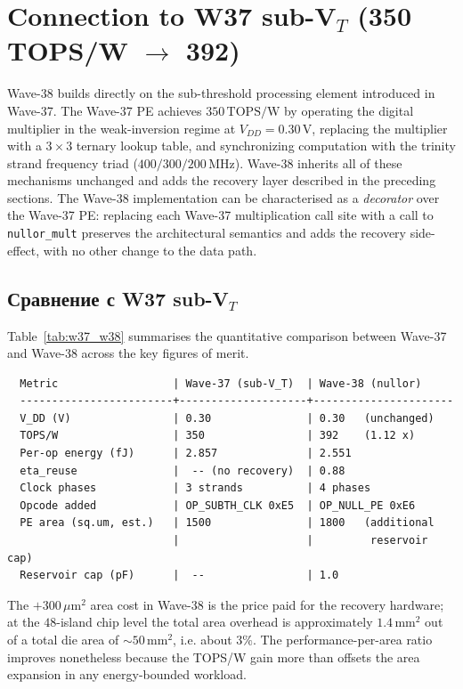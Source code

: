 \section{Connection to W37 sub-V$_T$ (350 TOPS/W $\to$ 392)}
\label{sec:w37_w38_link}

Wave-38 builds directly on the sub-threshold processing element introduced in
Wave-37.  The Wave-37 PE achieves $350\,\text{TOPS/W}$ by operating the digital
multiplier in the weak-inversion regime at $V_{DD} = 0.30\,\text{V}$, replacing the
multiplier with a $3\times 3$ ternary lookup table, and synchronizing computation
with the trinity strand frequency triad ($400/300/200\,\text{MHz}$).  Wave-38
inherits all of these mechanisms unchanged and adds the recovery layer described in
the preceding sections.  The Wave-38 implementation can be characterised as a
\emph{decorator} over the Wave-37 PE: replacing each Wave-37 multiplication call
site with a call to \texttt{nullor\_mult} preserves the architectural
semantics and adds the recovery side-effect, with no other change to the data path.

\subsection{Сравнение с W37 sub-V$_T$}
\label{subsec:w37_compare}

Table~\ref{tab:w37_w38} summarises the quantitative comparison between Wave-37 and
Wave-38 across the key figures of merit.
\begin{verbatim}
  Metric                  | Wave-37 (sub-V_T)  | Wave-38 (nullor)
  ------------------------+--------------------+----------------------
  V_DD (V)                | 0.30               | 0.30   (unchanged)
  TOPS/W                  | 350                | 392    (1.12 x)
  Per-op energy (fJ)      | 2.857              | 2.551
  eta_reuse               |  -- (no recovery)  | 0.88
  Clock phases            | 3 strands          | 4 phases
  Opcode added            | OP_SUBTH_CLK 0xE5  | OP_NULL_PE 0xE6
  PE area (sq.um, est.)   | 1500               | 1800   (additional
                          |                    |         reservoir cap)
  Reservoir cap (pF)      |  --                | 1.0
\end{verbatim}
The $+300\,\mu\text{m}^2$ area cost in Wave-38 is the price paid for the recovery
hardware; at the $48$-island chip level the total area overhead is approximately
$1.4\,\text{mm}^2$ out of a total die area of $\sim 50\,\text{mm}^2$, i.e. about
$3\%$.  The performance-per-area ratio improves nonetheless because the TOPS/W gain
more than offsets the area expansion in any energy-bounded workload.

